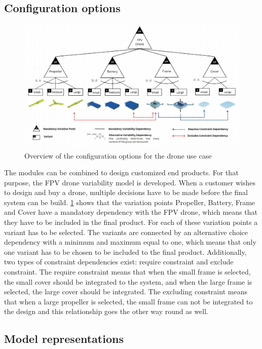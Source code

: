 \documentclass[sigconf,review,anonymous]{acmart}
\begin{document}
\subsection{Configuration options}
\label{sec:configuration-options}

\begin{figure}[htbp]
    \includegraphics[width=\textwidth]{./FeatureTreeWithLegend3.jpg}
    \caption{Overview of the configuration options for the drone use case}
    \label{fig:feature-tree}
\end{figure}

The modules can be combined to design customized end products.  
For that purpose, the FPV drone variability model is developed. 
When a customer wishes to design and buy a drone, multiple decisions have to be made before the final system can be build. 
\cref{fig:feature-tree} shows that the variation points Propeller, Battery, Frame and Cover have a mandatory dependency with the FPV drone, which means that they have to be included in the final product. 
For each of these variation points a variant has to be selected. 
The variants are connected by an alternative choice dependency with a minimum and maximum equal to one, which means that only one variant has to be chosen to be included to the final product. 
Additionally, two types of constraint dependencies exist: require constraint and exclude constraint. 
The require constraint means that when the small frame is selected, the small cover should be integrated to the system, and when the large frame is selected, the large cover should be integrated. 
The excluding constraint means that when a large propeller is selected, the small frame can not be integrated to the design and this relationship goes the other way round as well.

\subsection{Model representations}
\label{sec:150-model}
\end{document}

